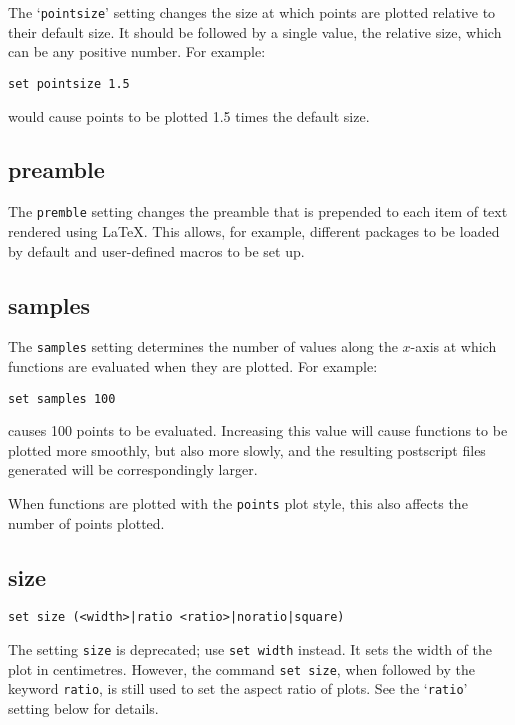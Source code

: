 The `{\tt pointsize}' setting changes the size at which points are plotted
relative to their default size. It should be followed by a single value, the
relative size, which can be any positive number. For example:

\begin{verbatim}
set pointsize 1.5
\end{verbatim}

\noindent would cause points to be plotted 1.5 times the default size.

\subsection{preamble}

The {\tt premble} setting changes the preamble that is prepended to each item of
text rendered using \LaTeX{}.  This allows, for example, different packages to
be loaded by default and user-defined macros to be set up.

\subsection{samples}

The {\tt samples} setting determines the number of values along the $x$-axis at
which functions are evaluated when they are plotted. For example:

\begin{verbatim}
set samples 100
\end{verbatim}

\noindent causes 100 points to be evaluated.  Increasing this value will cause functions
to be plotted more smoothly, but also more slowly, and the resulting postscript
files generated will be correspondingly larger.

When functions are plotted with the {\tt points} plot style, this also affects
the number of points plotted.


\subsection{size}

\begin{verbatim}
set size (<width>|ratio <ratio>|noratio|square)
\end{verbatim}

The setting {\tt size} is deprecated; use {\tt set width} instead.  It sets the
width of the plot in centimetres. However, the command {\tt set size}, when
followed by the keyword {\tt ratio}, is still used to set the aspect ratio of
plots. See the `{\tt ratio}' setting below for details.

